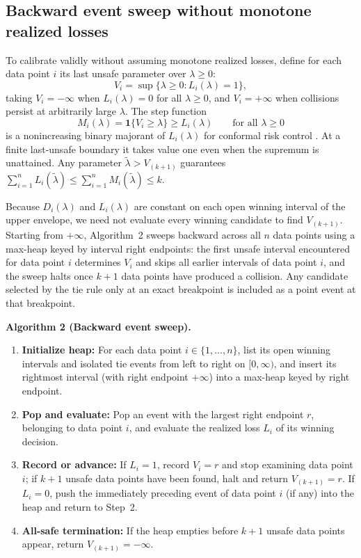 \documentclass[a4paper,10pt]{article}
\theoremstyle{plain}
\theoremstyle{remark}
\begin{document}
\subsection{Backward event sweep without monotone realized losses}\label{sec:sweep}

To calibrate validly without assuming monotone realized losses, define for each data point $i$ its last unsafe parameter over $\lambda\ge0$:
\begin{equation}\label{eq:V}
 V_i=\sup\{\lambda\ge0:L_i(\lambda)=1\},
\end{equation}
taking $V_i=-\infty$ when $L_i(\lambda)=0$ for all $\lambda\ge0$, and $V_i=+\infty$ when collisions persist at arbitrarily large $\lambda$. The step function
\begin{equation}\label{eq:maj}
 M_i(\lambda)=\mathbf1\{V_i\ge\lambda\}\ge L_i(\lambda)\qquad\text{for all }\lambda\ge0
\end{equation}
is a nonincreasing binary majorant of $L_i(\lambda)$ for conformal risk control \cite{crc}. At a finite last-unsafe boundary it takes value one even when the supremum is unattained. Any parameter $\widetilde\lambda>V_{(k+1)}$ guarantees $\sum_{i=1}^n L_i(\widetilde\lambda)\le\sum_{i=1}^n M_i(\widetilde\lambda)\le k$.

Because $D_i(\lambda)$ and $L_i(\lambda)$ are constant on each open winning interval of the upper envelope, we need not evaluate every winning candidate to find $V_{(k+1)}$. Starting from $+\infty$, Algorithm~2 sweeps backward across all $n$ data points using a max-heap keyed by interval right endpoints: the first unsafe interval encountered for data point $i$ determines $V_i$ and skips all earlier intervals of data point $i$, and the sweep halts once $k+1$ data points have produced a collision. Any candidate selected by the tie rule only at an exact breakpoint is included as a point event at that breakpoint.

\begin{samepage}
\textbf{Algorithm 2 (Backward event sweep).}
\begin{enumerate}
\setlength{\itemsep}{2pt}\setlength{\topsep}{3pt}
\item \textbf{Initialize heap:} For each data point $i\in\{1,\ldots,n\}$, list its open winning intervals and isolated tie events from left to right on $[0,\infty)$, and insert its rightmost interval (with right endpoint $+\infty$) into a max-heap keyed by right endpoint.
\item \textbf{Pop and evaluate:} Pop an event with the largest right endpoint $r$, belonging to data point $i$, and evaluate the realized loss $L_i$ of its winning decision.
\item \textbf{Record or advance:} If $L_i=1$, record $V_i=r$ and stop examining data point $i$; if $k+1$ unsafe data points have been found, halt and return $V_{(k+1)}=r$. If $L_i=0$, push the immediately preceding event of data point $i$ (if any) into the heap and return to Step~2.
\item \textbf{All-safe termination:} If the heap empties before $k+1$ unsafe data points appear, return $V_{(k+1)}=-\infty$.
\end{enumerate}
\end{samepage}
\end{document}
